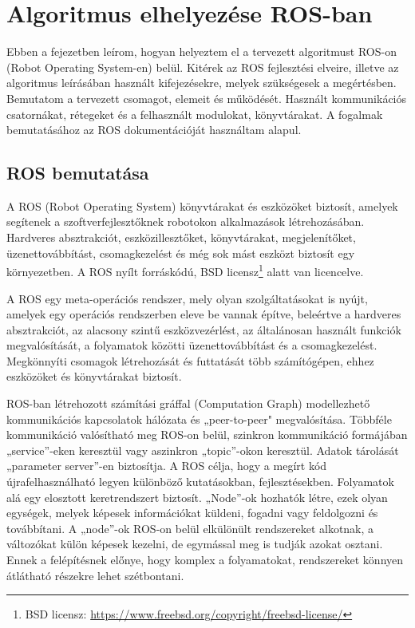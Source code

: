 \chapter{Algoritmus elhelyezése ROS-ban}
\label{sec:inros}

Ebben a fejezetben leírom, hogyan helyeztem el a tervezett algoritmust ROS-on (Robot Operating System-en) \cite{ros} belül. Kitérek az ROS fejlesztési elveire, illetve az algoritmus leírásában használt kifejezésekre, melyek szükségesek a megértésben. Bemutatom a tervezett csomagot, elemeit és működését. Használt kommunikációs csatornákat, rétegeket és a felhasznált modulokat, könyvtárakat. A fogalmak bemutatásához az ROS dokumentációját \cite{ros} használtam alapul.

\section{ROS bemutatása}
A ROS (Robot Operating System) könyvtárakat és eszközöket biztosít, amelyek segítenek a szoftverfejlesztőknek robotokon alkalmazások létrehozásában. Hardveres absztrakciót, eszközillesztőket, könyvtárakat, megjelenítőket, üzenettovábbítást, csomagkezelést és még sok mást eszközt biztosít egy környezetben. A ROS nyílt forráskódú, BSD licensz\footnote{BSD licensz: \url{https://www.freebsd.org/copyright/freebsd-license/}} alatt van licencelve.

A ROS egy meta-operációs rendszer, mely olyan szolgáltatásokat is nyújt, amelyek egy operációs rendszerben eleve be vannak építve, beleértve a hardveres absztrakciót, az alacsony szintű eszközvezérlést, az általánosan használt funkciók megvalósítását, a folyamatok közötti üzenettovábbítást és a csomagkezelést. Megkönnyíti csomagok létrehozását és futtatását több számítógépen, ehhez eszközöket és könyvtárakat biztosít.

ROS-ban létrehozott számítási gráffal (Computation Graph) modellezhető kommunikációs kapcsolatok hálózata és „peer-to-peer" megvalósítása. Többféle kommunikáció valósítható meg ROS-on belül, szinkron kommunikáció formájában „service”-eken keresztül vagy aszinkron „topic”-okon keresztül. Adatok tárolását „parameter server”-en biztosítja.
A ROS célja, hogy a megírt kód újrafelhasználható legyen különböző kutatásokban, fejlesztésekben. Folyamatok alá egy elosztott keretrendszert biztosít. „Node”-ok hozhatók létre, ezek olyan egységek, melyek képesek információkat küldeni, fogadni vagy feldolgozni és továbbítani. A „node”-ok ROS-on belül elkülönült rendszereket alkotnak, a változókat külön képesek kezelni, de egymással meg is tudják azokat osztani. Ennek a felépítésnek előnye, hogy komplex a folyamatokat, rendszereket könnyen átlátható részekre lehet szétbontani.

